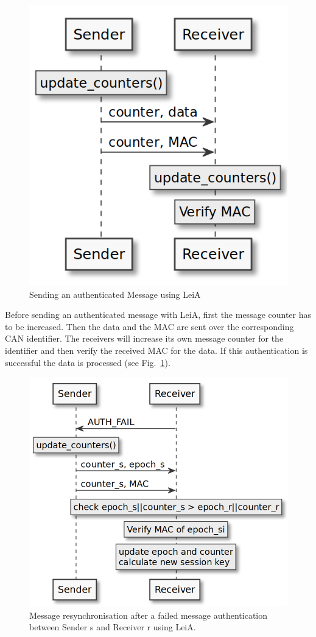 \begin{figure}[ht]
    \centering
    \captionsetup{justification=centering}
	\includegraphics[width=0.6\linewidth]{Figures/LeiA_sending_msg.png}
	\caption[]{Sending an authenticated Message using LeiA}\label{fig:leia_sending_msg}
\end{figure}

Before sending an authenticated message with LeiA, first the message counter has
to be increased. Then the data and the MAC are sent over the corresponding CAN
identifier. The receivers will increase its own message counter for the
identifier and then verify the received MAC for the data. If this authentication
is successful the data is processed (see Fig.~\ref{fig:leia_sending_msg}).

\begin{figure}[ht]
    \centering
    \captionsetup{justification=centering}
	\includegraphics[width=1\linewidth]{Figures/LeiA_resync.png}
    \caption[]{Message resynchronisation after a failed message authentication 
    between Sender s and Receiver r using LeiA.}\label{fig:leia_resync}
\end{figure}


